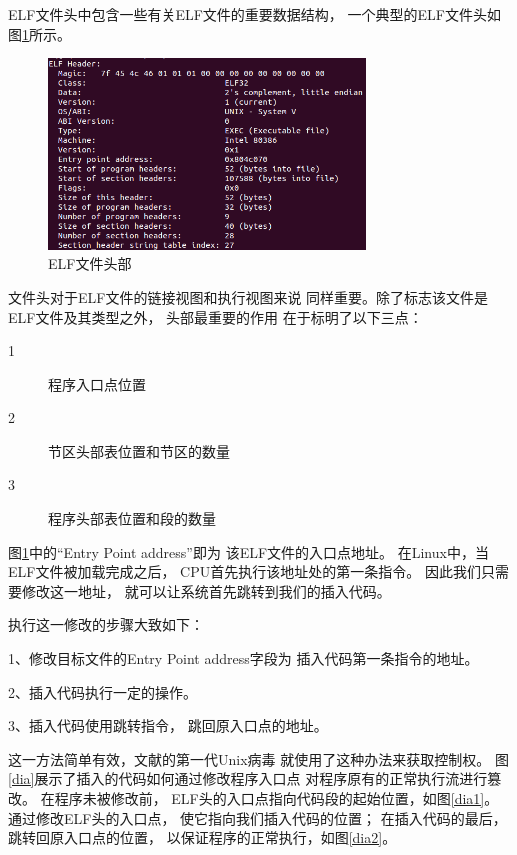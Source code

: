 ELF文件头中包含一些有关ELF文件的重要数据结构，
一个典型的ELF文件头如图\ref{header}所示。
\begin{figure}[!ht]
  \centering
  \includegraphics[width=0.75\textwidth]{figure/header.png}
  \caption{ELF文件头部}
  \label{header}
\end{figure}
文件头对于ELF文件的链接视图和执行视图来说
同样重要。除了标志该文件是ELF文件及其类型之外，
头部最重要的作用
在于标明了以下三点：

\begin{description}
  \item [1]  程序入口点位置
  \item [2]  节区头部表位置和节区的数量
  \item [3]  程序头部表位置和段的数量 
\end{description}

图\ref{header}中的“Entry Point address”即为
该ELF文件的入口点地址。
在Linux中，当ELF文件被加载完成之后，
CPU首先执行该地址处的第一条指令。
因此我们只需要修改这一地址，
就可以让系统首先跳转到我们的插入代码。

执行这一修改的步骤大致如下：

1、修改目标文件的Entry Point address字段为
插入代码第一条指令的地址。

2、插入代码执行一定的操作。

3、插入代码使用跳转指令，
跳回原入口点的地址。

这一方法简单有效，文献\cite{silvio}的第一代Unix病毒
就使用了这种办法来获取控制权。
图\ref{dia}展示了插入的代码如何通过修改程序入口点
对程序原有的正常执行流进行篡改。
在程序未被修改前，
ELF头的入口点指向代码段的起始位置，如图\ref{dia1}。
通过修改ELF头的入口点，
使它指向我们插入代码的位置；
在插入代码的最后，跳转回原入口点的位置，
以保证程序的正常执行，如图\ref{dia2}。

